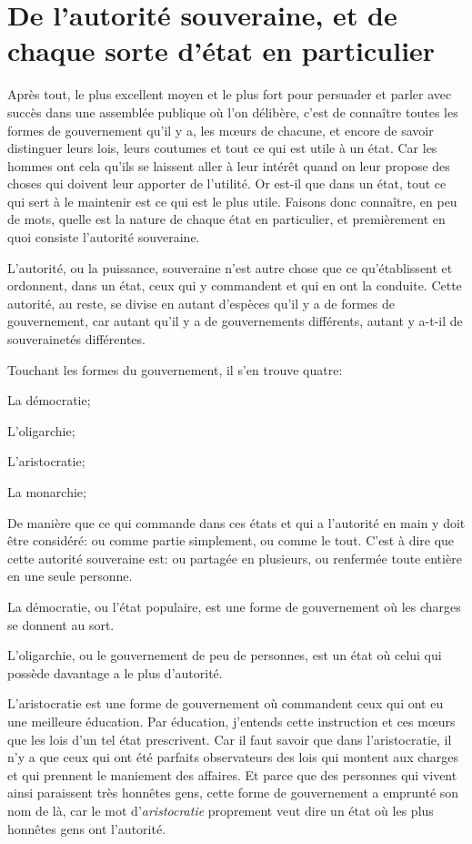 
\section{De l'autorité souveraine, et de chaque sorte d'état en particulier}


Après tout, le plus excellent moyen et le plus fort pour persuader et parler avec succès dans
une assemblée publique où l'on délibère, c'est de connaître toutes les formes de gouvernement
qu'il y a, les mœurs de chacune, et encore de savoir distinguer leurs lois, leurs coutumes et
tout ce qui est utile à un état. Car les hommes ont cela  qu'ils se laissent aller à leur intérêt
quand on leur propose des choses qui doivent leur apporter de l'utilité. Or est-il que dans un état,
tout ce qui sert à le maintenir est ce qui est le plus utile. Faisons donc connaître, en peu de mots,
quelle est la nature de chaque état en particulier, et premièrement en quoi consiste l'autorité
souveraine. 

\bigbreak

L'autorité, ou la puissance, souveraine n'est autre chose que ce qu’établissent et ordonnent, dans un
état, ceux qui y commandent et qui en ont la conduite. Cette autorité, au reste, se divise en autant
d'espèces qu'il y a de formes de gouvernement, car autant qu'il y a de gouvernements différents, autant
y a-t-il de souverainetés différentes.

\bigbreak

Touchant les formes du gouvernement, il s'en trouve quatre:

\begin{emphpar}
	La démocratie;

	L'oligarchie;

	L'aristocratie;

	La monarchie;
\end{emphpar}

De manière que ce qui commande dans ces états et qui a l'autorité en main y doit être considéré: ou comme
partie simplement, ou comme le tout. C'est à dire que cette autorité souveraine est: ou partagée en
plusieurs, ou renfermée toute entière en une seule personne.

La démocratie, ou l'état populaire, est une forme de gouvernement où les charges se donnent au sort.

L'oligarchie, ou le gouvernement de peu de personnes, est un état où celui qui possède davantage a le plus
d'autorité.

L'aristocratie est une forme de gouvernement où commandent ceux qui ont eu une meilleure éducation. Par
éducation, j'entends cette instruction et ces mœurs que les lois d'un tel état prescrivent. Car il faut
savoir que dans l'aristocratie, il n'y a que ceux qui ont été parfaits observateurs des lois qui montent
aux charges et qui prennent le maniement des affaires. Et parce que des personnes qui vivent ainsi paraissent
très honnêtes gens, cette forme de gouvernement a emprunté son nom de là, car le mot d'\emph{aristocratie}
proprement veut dire un état où les plus honnêtes gens ont l'autorité.

